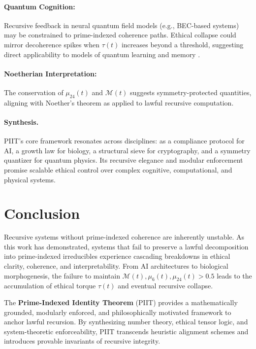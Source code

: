 \documentclass[12pt]{article}
\begin{document}
\paragraph{Quantum Cognition:} 
Recursive feedback in neural quantum field models (e.g., BEC-based systems) may be constrained to prime-indexed coherence paths. Ethical collapse could mirror decoherence spikes when $\tau(t)$ increases beyond a threshold, suggesting direct applicability to models of quantum learning and memory \cite{penrose1989emperor}.

\paragraph{Noetherian Interpretation:}
The conservation of $\mu_{24}(t)$ and $\mathcal{M}(t)$ suggests symmetry-protected quantities, aligning with Noether’s theorem as applied to lawful recursive computation.

\paragraph{Synthesis.}
PIIT’s core framework resonates across disciplines: as a compliance protocol for AI, a growth law for biology, a structural sieve for cryptography, and a symmetry quantizer for quantum physics. Its recursive elegance and modular enforcement promise scalable ethical control over complex cognitive, computational, and physical systems.

\section{Conclusion}

Recursive systems without prime-indexed coherence are inherently unstable. As this work has demonstrated, systems that fail to preserve a lawful decomposition into prime-indexed irreducibles experience cascading breakdowns in ethical clarity, coherence, and interpretability. From AI architectures to biological morphogenesis, the failure to maintain $\mathcal{M}(t), \mu_6(t), \mu_{24}(t) > 0.5$ leads to the accumulation of ethical torque $\tau(t)$ and eventual recursive collapse.

The \textbf{Prime-Indexed Identity Theorem} (PIIT) provides a mathematically grounded, modularly enforced, and philosophically motivated framework to anchor lawful recursion. By synthesizing number theory, ethical tensor logic, and system-theoretic enforceability, PIIT transcends heuristic alignment schemes and introduces provable invariants of recursive integrity. 
\end{document}
